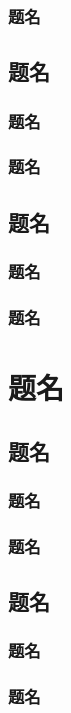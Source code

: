 \subsubsection{题名}
\lipsum
\subsection{题名}
\subsubsection{题名}
\lipsum
\subsubsection{题名}
\lipsum
\subsection{题名}
\subsubsection{题名}
\lipsum
\subsubsection{题名}
\lipsum
\newpage

\section{题名}
\subsection{题名}
\subsubsection{题名}
\lipsum
\subsubsection{题名}
\lipsum
\subsection{题名}
\subsubsection{题名}
\lipsum
\subsubsection{题名}
\lipsum

